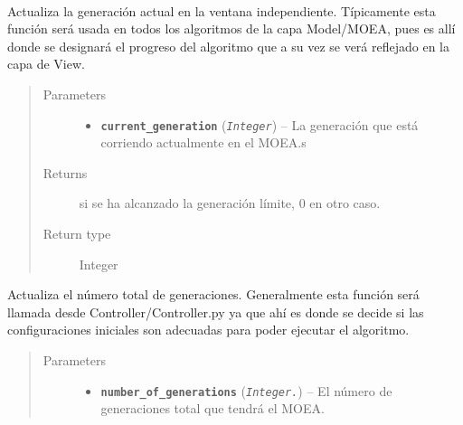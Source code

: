 \documentclass[class=report, crop=false]{standalone}
\begin{document}
\begin{fulllineitems}
\begin{fulllineitems}
\end{fulllineitems}

\begin{fulllineitems}

~
\vspace{-0.3cm}

Actualiza la generación actual en la ventana independiente.\break
Típicamente esta función será usada en todos los algoritmos de la 
capa Model/MOEA, pues es allí donde se designará el progreso del 
algoritmo que a su vez se verá reflejado en la capa de View.

\begin{quote}\begin{description}
\item[{Parameters}] \leavevmode\begin{itemize}
\item \textbf{\texttt{current\_generation}} (\emph{\texttt{Integer}}) -- La generación que está corriendo actualmente en el MOEA.s
\end{itemize}

\item[{Returns}]  si se  ha alcanzado la generación límite, 0 en otro caso.
\item[{Return type}] \leavevmode
Integer
\end{description}\end{quote}

\end{fulllineitems}

\begin{fulllineitems}

Actualiza el número total de generaciones.\break
Generalmente esta función será llamada desde Controller/Controller.py 
ya que ahí es donde se decide si las configuraciones iniciales son 
adecuadas para poder ejecutar el algoritmo.

\begin{quote}\begin{description}
\item[{Parameters}] \leavevmode\begin{itemize}
\item \textbf{\texttt{number\_of\_generations}} (\emph{\texttt{Integer.}}) -- El número de generaciones total que tendrá el MOEA.
\end{itemize}
\end{description}\end{quote}

\end{fulllineitems}

\end{fulllineitems}
\end{document}
